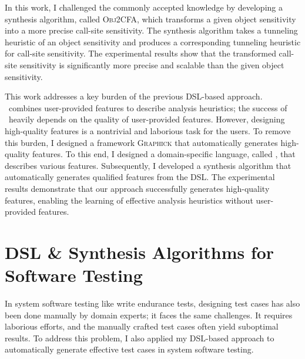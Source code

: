 \documentclass[11pt]{article}
\newcommand{\myparagraph}[1]{\medskip\noindent{\it \textbf{#1.}}}
\begin{document}
In this work, I challenged the commonly accepted knowledge by developing a synthesis algorithm, called \textsc{Obj2CFA}, which transforms a given object sensitivity into a more precise call-site sensitivity.
%
The synthesis algorithm takes a tunneling heuristic of an object sensitivity and produces a corresponding tunneling heuristic for call-site sensitivity.
%
The experimental results show that the transformed call-site sensitivity is significantly more precise and scalable than the given object sensitivity.




\myparagraph{Graphick~\cite{Jeon20}}
%
This work addresses a key burden of the previous DSL-based approach. 
%
\DisjunctiveModel~combines user-provided features to describe analysis heuristics; the success of \DisjunctiveModel~heavily depends on the quality of user-provided features.
%
However, designing high-quality features is a nontrivial and laborious task for the users.
%
To remove this burden, I designed a framework \textsc{Graphick} that automatically generates high-quality features.
%
To this end, I designed a domain-specific language, called \FeatureLanguage, that describes various features.
%
Subsequently, I developed a synthesis algorithm that automatically generates qualified features from the DSL.
%
The experimental results demonstrate that our approach successfully generates high-quality features, enabling the learning of effective analysis heuristics without user-provided features.




\section{DSL \& Synthesis Algorithms for Software Testing}
%
In system software testing like write endurance tests, designing test cases has also been done manually by domain experts; it faces the same challenges.
It requires laborious efforts, and the manually crafted test cases often yield suboptimal results.
%
To address this problem, I also applied my DSL-based approach to automatically generate effective test cases in system software testing.
\end{document}

